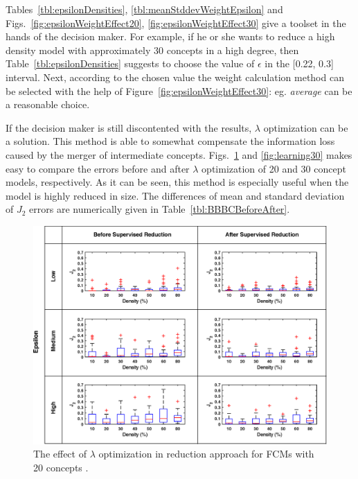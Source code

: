 \documentclass[graybox]{svmult}
\begin{document}
Tables~\ref{tbl:epsilonDensities}, \ref{tbl:meanStddevWeightEpsilon} and 
Figs.~\ref{fig:epsilonWeightEffect20}, \ref{fig:epsilonWeightEffect30} give 
a toolset in the hands of the decision maker. For example, if he or she 
wants to reduce a high density model with approximately 30 concepts in a high 
degree, then Table~\ref{tbl:epsilonDensities} suggests to choose the 
value of $\epsilon$ in the [0.22, 0.3] interval. Next, according to the 
chosen value the weight calculation method can be selected with the 
help of Figure~\ref{fig:epsilonWeightEffect30}: eg. \emph{average} can be a 
reasonable choice.

If the decision maker is still discontented with the results, $\lambda$ 
optimization can be a solution. This method is able to somewhat 
compensate the information loss caused by the merger of intermediate 
concepts. Figs.~\ref{fig:learning20} and \ref{fig:learning30} makes easy 
to compare the errors before and after $\lambda$ optimization of 20 and 
30 concept models, respectively. As it can be seen, this method is 
especially useful when the model is highly reduced in size. The 
differences of mean and standard deviation of $J_2$ errors are 
numerically given in Table~\ref{tbl:BBBCBeforeAfter}.

\begin{figure}[hbt]
  \includegraphics[width=\textwidth]{j2_sup_c20.eps}
  \caption{The effect of $\lambda$ optimization in reduction approach for 
  FCMs with 20 concepts \cite{hatwagner2018two}.}
  \label{fig:learning20}
\end{figure}
\end{document}
